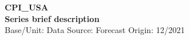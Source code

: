 \documentclass[a4paper,10pt]{article}
\begin{document}
\thispagestyle{empty}
\begin{landscape}
\begin{center}

\textbf{CPI_USA} \\ 

\textbf{Series brief description} \\ 

Base/Unit: 
\space \space \space Data Source:  
\space \space \space Forecast Origin: 12/2021 \\ 
\end{center}

\begin{footnotesize} \singlespacing  \end{footnotesize} 

\end{landscape}
\end{document}

